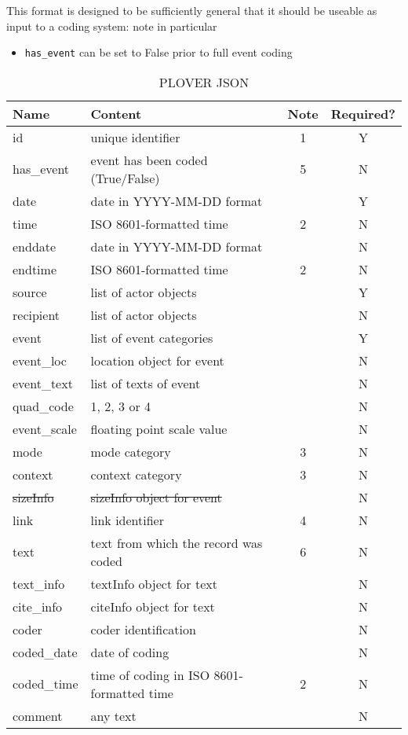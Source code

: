 \documentclass[11pt]{report}
\begin{document}
This format is designed to be sufficiently general that it should be useable as input to a coding system: note in particular
\begin{itemize}
\item \texttt{has\_event} can be set to False prior to full event coding 
\end{itemize}

\newpage 

\begin{table}[htp]
\caption{PLOVER JSON }
\begin{center}
\begin{tabular}{|l|l|c|c|}
\hline
Name & Content & Note & Required? \\
\hline
id & unique identifier & 1 & Y\\
has\_event & event has been coded (True/False) & 5 & N\\
date & date in YYYY-MM-DD format &  & Y\\
time & ISO 8601-formatted time & 2 & N\\
enddate & date in YYYY-MM-DD format &  & N\\
endtime & ISO 8601-formatted time & 2 & N\\
source & list of actor objects & & Y \\
recipient & list of actor objects & & N \\
event & list of event categories & & Y \\
event\_loc & location object for event & & N \\
event\_text & list of texts of event & & N \\
quad\_code & 1, 2, 3 or 4 & & N \\
event\_scale & floating point scale value & & N \\
mode & mode category & 3 & N \\
context & context category & 3 & N \\
\sout{sizeInfo} & \sout{sizeInfo object for event}  & & N \\
link &  link identifier & 4 & N \\
text & text from which the record was coded & 6 & N \\
text\_info & textInfo object for text & & N \\
cite\_info & citeInfo object for text & & N \\
coder &  coder identification & & N \\
coded\_date & date of coding & & N \\
coded\_time & time of coding in ISO 8601-formatted time & 2 & N\\
comment &  any text & & N \\
\hline
\end{tabular}
\end{center}
\label{tab:json}
\end{table}
\end{document}
